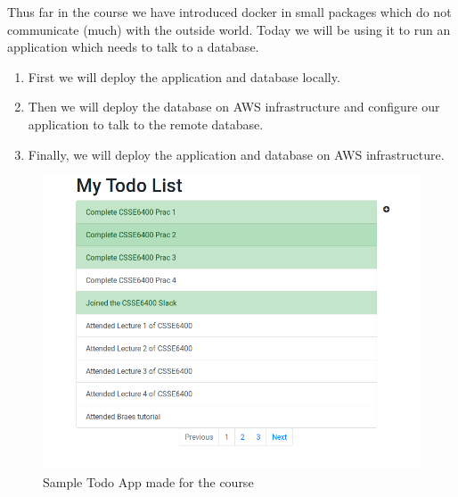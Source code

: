\documentclass{csse4400}
\begin{document}
Thus far in the course we have introduced docker in small packages which do not communicate (much) with the outside world.
Today we will be using it to run an application which needs to talk to a database.
\begin{enumerate}
\item First we will deploy the application and database locally.
\item Then we will deploy the database on AWS infrastructure and configure our application to talk to the remote database.
\item Finally, we will deploy the application and database on AWS infrastructure.
\end{enumerate}

\begin{figure}[H]
  \includegraphics[width=\textwidth]{images/todoapp}
\caption{Sample Todo App made for the course}
\end{figure}

\end{document}
